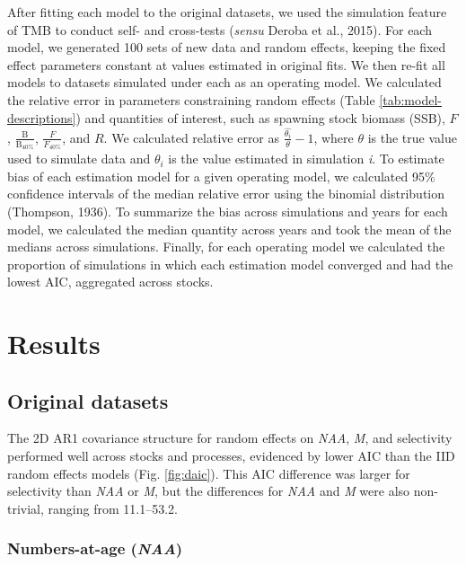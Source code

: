 \documentclass[]{article}
\begin{document}
After fitting each model to the original datasets, we used the
simulation feature of TMB to conduct self- and cross-tests (\emph{sensu}
Deroba et al., 2015). For each model, we generated 100 sets of new data
and random effects, keeping the fixed effect parameters constant at
values estimated in original fits. We then re-fit all models to datasets
simulated under each as an operating model. We calculated the relative
error in parameters constraining random effects (Table
\ref{tab:model-descriptions}) and quantities of interest, such as
spawning stock biomass (SSB), \(F\),
\(\frac{\text{B}}{\text{B}_{40\%}}\), \(\frac{F}{F_{40\%}}\), and \(R\).
We calculated relative error as \(\frac{\hat{\theta_i}}{\theta}-1\),
where \(\theta\) is the true value used to simulate data and
\(\theta_i\) is the value estimated in simulation \emph{i}. To estimate
bias of each estimation model for a given operating model, we calculated
95\% confidence intervals of the median relative error using the
binomial distribution (Thompson, 1936). To summarize the bias across
simulations and years for each model, we calculated the median quantity
across years and took the mean of the medians across simulations.
Finally, for each operating model we calculated the proportion of
simulations in which each estimation model converged and had the lowest
AIC, aggregated across stocks.

\hypertarget{results}{%
\section{Results}\label{results}}

\hypertarget{original-datasets}{%
\subsection{Original datasets}\label{original-datasets}}

The 2D AR1 covariance structure for random effects on \emph{NAA},
\emph{M}, and selectivity performed well across stocks and processes,
evidenced by lower AIC than the IID random effects models (Fig.
\ref{fig:daic}). This AIC difference was larger for selectivity than
\emph{NAA} or \emph{M}, but the differences for \emph{NAA} and \emph{M}
were also non-trivial, ranging from 11.1--53.2.

\hypertarget{numbers-at-age-naa-1}{%
\subsubsection{\texorpdfstring{Numbers-at-age
(\emph{NAA})}{Numbers-at-age (NAA)}}\label{numbers-at-age-naa-1}}
\end{document}

